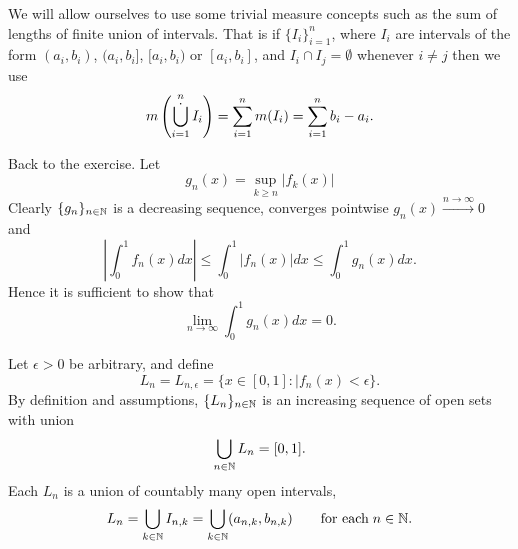 \begin{enumerate}
We will allow ourselves to use some trivial measure concepts
such as the sum of lengths of finite union of intervals.
That is if \(\{I_i\}_{i=1}^n\),
where \(I_i\) are intervals of the form
\((a_i,b_i)\),
\((a_i,b_i]\),
\([a_i,b_i)\) or
\([a_i,b_i]\), and \(I_i \cap I_j = \emptyset\) whenever \(i\neq j\) then
we use
\begin{equation*}
m\left(\Disjunion_{i=1}^n I_i\right) =
\sum_{i=1}^n m(I_i) = \sum_{i=1}^n b_i - a_i.
\end{equation*}

\iffalse
Back to the exercise. Let us define some sequences of subsets of \([0,1]\)
(with nicknames) based on \(\{f_n\}_{i\in\N}\).
\begin{equation*}
\begin{array}{lcl@{\qquad}r}
 U_{n,k} &=&
    \{x\in [0,1]: |f_n(x)| \geq 1/k\}    & \textrm{(Upper)} \\ \\
 T_{n,k} &=&
   \bigcup\limits_{i=n}^\infty U_{i,k}   & \textrm{(Tail)} \\ \\
 R_k     &=&
    \bigcap\limits_{i=1}^\infty T_{i,k}  & \textrm{(Resistance)} \\
\end{array}
\end{equation*}

When looked closely, we see that \(R_k\) consists of all \(x\in[0,1]\)
such that \(|f_n(x)| \geq 1/k\)  for infinitely many $n$.
Thus the assumption that \(f_n(x)\to 0\) for all \(x\in[0,1]\)
means that
\begin{equation*}
\cap_{k\in\N} R_k = \emptyset.
\end{equation*}
\fi

Back to the exercise. Let
\begin{equation*}
 g_n(x) = \sup_{k\geq n} |f_k(x)|
\end{equation*}
Clearly \(\{g_n\}_{n\in\mathbb{N}}\) is a decreasing sequence,
converges pointwise \(g_n(x)\xrightarrow{n\to\infty} 0\) and
\begin{equation*}
 \left|\int_0^1 f_n(x)dx\right|
 \leq  \int_0^1 |f_n(x)|dx \leq  \int_0^1 g_n(x)dx.
\end{equation*}
Hence it is sufficient to show that
\begin{equation} \label{eq:integ:gto0}
\lim_{n\to\infty} \int_0^1 g_n(x)dx = 0.
\end{equation}

Let \(\epsilon>0\) be arbitrary, and define
\begin{equation*}
 L_n = L_{n,\epsilon} = \{x\in[0,1]: |f_n(x) < \epsilon\}.
\end{equation*}
By definition and assumptions, \(\{L_n\}_{n\in\mathbb{N}}\) is an increasing
sequence of open sets with union
\begin{equation} \label{eq:ULn}
\bigcup_{n\in\mathbb{N}} L_n = [0,1].
\end{equation}
Each \(L_n\) is a union of countably many open intervals,
\begin{equation*}
 L_n = \bigcup_{k\in \mathbb{N}} I_{n,k} = \bigcup_{k\in \mathbb{N}} (a_{n,k}, b_{n,k})
 \qquad \textrm{for each}\; n\in\mathbb{N}.
\end{equation*}


\end{enumerate}
